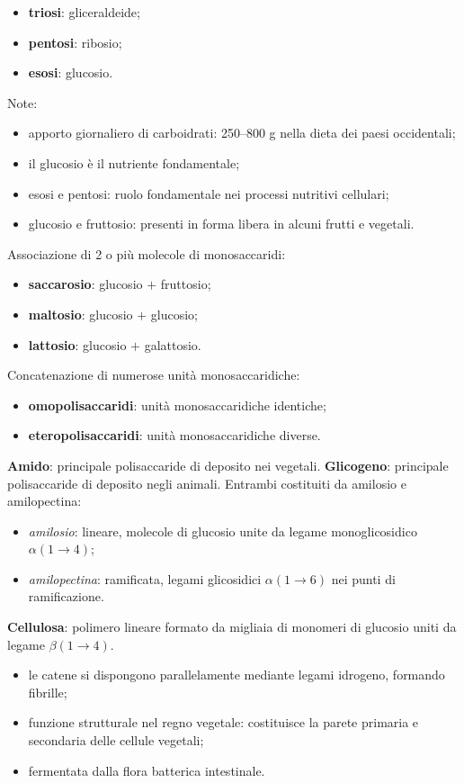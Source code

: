 \begin{itemize}
  \item \textbf{triosi}: gliceraldeide;
  \item \textbf{pentosi}: ribosio;
  \item \textbf{esosi}: glucosio.
\end{itemize}
Note:
\begin{itemize}
  \item apporto giornaliero di carboidrati: 250--800 g nella dieta dei paesi occidentali;
  \item il glucosio è il nutriente fondamentale;
  \item esosi e pentosi: ruolo fondamentale nei processi nutritivi cellulari;
  \item glucosio e fruttosio: presenti in forma libera in alcuni frutti e vegetali.
\end{itemize}

Associazione di 2 o più molecole di monosaccaridi:
\begin{itemize}
  \item \textbf{saccarosio}: glucosio $+$ fruttosio;
  \item \textbf{maltosio}: glucosio $+$ glucosio;
  \item \textbf{lattosio}: glucosio $+$ galattosio.
\end{itemize}

Concatenazione di numerose unità monosaccaridiche:
\begin{itemize}
  \item \textbf{omopolisaccaridi}: unità monosaccaridiche identiche;
  \item \textbf{eteropolisaccaridi}: unità monosaccaridiche diverse.
\end{itemize}

\textbf{Amido}: principale polisaccaride di deposito nei vegetali. \textbf{Glicogeno}: principale polisaccaride di deposito negli animali. Entrambi costituiti da amilosio e amilopectina:
\begin{itemize}
  \item \textit{amilosio}: lineare, molecole di glucosio unite da legame monoglicosidico $\alpha(1\rightarrow4)$;
  \item \textit{amilopectina}: ramificata, legami glicosidici $\alpha(1\rightarrow6)$ nei punti di ramificazione.
\end{itemize}

\textbf{Cellulosa}: polimero lineare formato da migliaia di monomeri di glucosio uniti da legame $\beta(1\rightarrow4)$.
\begin{itemize}
  \item le catene si dispongono parallelamente mediante legami idrogeno, formando fibrille;
  \item funzione strutturale nel regno vegetale: costituisce la parete primaria e secondaria delle cellule vegetali;
  \item fermentata dalla flora batterica intestinale.
\end{itemize}

